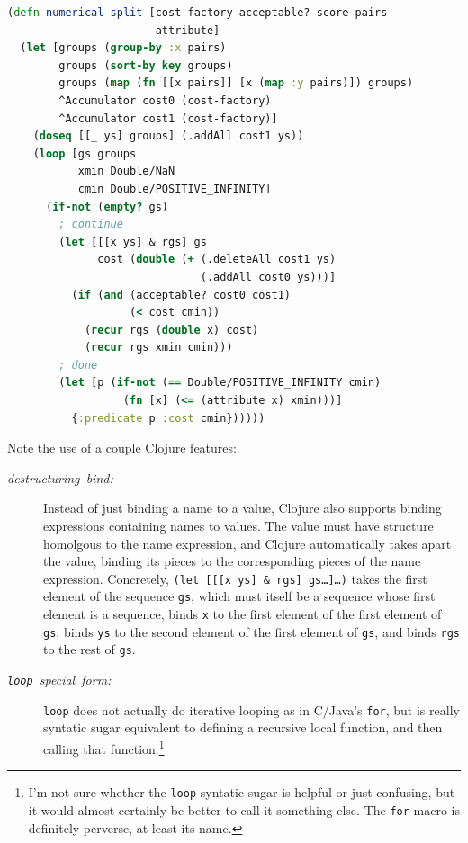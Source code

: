 \documentclass[11pt,openany,american,usenames,dvipsnames,svgnames,x11names,table,isodate]{article}
\numberwithin{equation}{section}
\numberwithin{figure}{section}
\begin{document}
\begin{minipage}[t]{1\columnwidth}%
\begin{lstlisting}[caption={Optimal split on a numerical attribute},label={lis:numerical-split},language=clojure,tabsize=2]
(defn numerical-split [cost-factory acceptable? score pairs
                       attribute]
  (let [groups (group-by :x pairs)
        groups (sort-by key groups)
        groups (map (fn [[x pairs]] [x (map :y pairs)]) groups)
        ^Accumulator cost0 (cost-factory)
        ^Accumulator cost1 (cost-factory)]
    (doseq [[_ ys] groups] (.addAll cost1 ys))
    (loop [gs groups
           xmin Double/NaN
           cmin Double/POSITIVE_INFINITY]
      (if-not (empty? gs)
        ; continue
        (let [[[x ys] & rgs] gs
              cost (double (+ (.deleteAll cost1 ys) 
                              (.addAll cost0 ys)))]
          (if (and (acceptable? cost0 cost1)
                   (< cost cmin)) 
            (recur rgs (double x) cost)
            (recur rgs xmin cmin)))
        ; done         
        (let [p (if-not (== Double/POSITIVE_INFINITY cmin)
                  (fn [x] (<= (attribute x) xmin)))]
          {:predicate p :cost cmin}))))) 
\end{lstlisting}
%
\end{minipage}

Note the use of a couple Clojure features:
\begin{description}
\item [{\emph{destructuring~bind:}}] Instead of just binding a name to
a value, Clojure also supports binding expressions containing names
to values. The value must have structure homolgous to the name expression,
and Clojure automatically takes apart the value, binding its pieces
to the corresponding pieces of the name expression. Concretely, \texttt{(let~{[}{[}{[}x
ys{]}~\&~rgs{]}~gs\ldots{}{]}\ldots{})} takes the first element
of the sequence \texttt{gs}, which must itself be a sequence whose
first element is a sequence, binds \texttt{x} to the first element
of the first element of \texttt{gs}, binds \texttt{ys} to the second
element of the first element of \texttt{gs}, and binds \texttt{rgs}
to the rest of \texttt{gs}.
\item [{\texttt{\emph{loop}}\emph{~special~form:}}] \texttt{loop} does
not actually do iterative looping as in C/Java's \texttt{for}, but
is really syntatic sugar equivalent to defining a recursive local
function, and then calling that function.\footnote{I'm not sure whether the \texttt{loop} syntatic sugar is helpful or
just confusing, but it would almost certainly be better to call it
something else. The \texttt{for} macro is definitely perverse, at
least its name.} 
\end{description}
\end{document}
